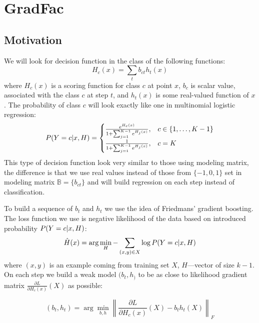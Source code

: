 \documentclass{article}
\begin{document}
\section{GradFac}

\subsection{Motivation}
We will look for decision function in the class of the following functions:
$$
H_c(x) = \sum_t b_{ct} h_t(x) 
$$
where $H_c(x)$ is a scoring function for class $c$ at point $x$, $b_c$ is scalar value, associated with the class $c$ at step $t$, and $h_t(x)$ is some real-valued function of $x$. The probability of class $c$ will look exactly like one in multinomial logistic regression:
\begin{equation}
  P(Y = c \arrowvert x, H) =
  \begin{cases}
    \frac{ e^{H_{c}(x)} }
       { 1+\sum_{j=1}^{K-1} e^{H_{j}(x)} }
    , & c \in \{1, \ldots, K-1 \} \\

    \frac{ 1 }
       { 1 + \sum_{j=1}^{K-1} e^{H_{j}(x)} }
    , & c=K
  \end{cases}\label{eq:MLR_model}
\end{equation}
This type of decision function look very similar to those using modeling matrix, the difference is that we use real values instead of those from $\{-1,0,1\}$ set in modeling matrix $\mathbb{B} = \{b_{ct}\}$ and will build regression on each step instead of classification.

To build a sequence of $b_t$ and $h_t$ we use the idea of Friedmans' gradient boosting. The loss function we use is negative likelihood of the data based on introduced probability $P(Y = c \arrowvert x, H)$:
$$
\hat{H}(x) = \arg \min_H - \sum_{(x,y) \in X} \log P(Y = c \arrowvert x, H)
$$
where $(x,y)$ is an example coming from training set $X$, $H$---vector of size $k-1$. On each step we build a weak model $(b_t, h_)$ to be as close to likelihood gradient matrix $\frac{\partial L}{\partial H_c(x)}\left(X\right)$ as possible:

$$
(b_t, h_t) = \arg \min_{b,h} \left\|\frac{\partial L}{\partial H_c(x)}\left(X\right) - b_t h_t(X)\right\|_F
$$


\end{document}
